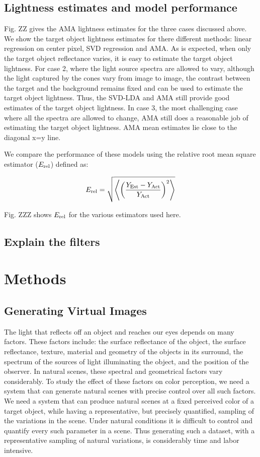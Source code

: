 \documentclass{jov}
\begin{document}
\subsection{Lightness estimates and model performance}
Fig. ZZ gives the AMA lightness estimates for the three cases discussed above. We show the target object lightness estimates for there different methods: linear regression on center pixel, SVD regression and AMA. As is expected, when only the target object reflectance varies, it is easy to estimate the target object lightness. For case 2, where the light source spectra are allowed to vary, although the light captured by the cones vary from image to image, the contrast between the target and the background remains fixed and can be used to estimate the target object lightness. Thus, the SVD-LDA and AMA still provide good estimates of the target object lightness. In case 3, the most challenging case where all the spectra are allowed to change, AMA still does a reasonable job of estimating the target object lightness. AMA mean estimates lie close to the diagonal x=y line.

We compare the performance of these models using the relative root mean square estimator ($E_{\rm rel}$) defined as:

\begin{align}
E_{\rm rel} = \sqrt{\left\langle\left(\frac{Y_{\rm Est}-Y_{\rm Act}}{Y_{\rm Act}}\right)^2\right\rangle}
\end{align}

Fig. ZZZ shows $E_{\rm rel}$ for the various estimators used here.

\subsection{Explain the filters}

\section{Methods}
\subsection{Generating Virtual Images}
The light that reflects off an object and reaches our eyes depends on many factors. These factors include: the surface reflectance of the object, the surface reflectance, texture, material and geometry of the objects in its surround, the spectrum of the sources of light illuminating the object, and the position of the observer. In natural scenes, these spectral and geometrical factors vary considerably. To study the effect of these factors on color perception, we need a system that can generate natural scenes with precise control over all such factors. We need a system that can produce natural scenes at a fixed perceived color of a target object, while having a representative, but precisely quantified, sampling of the variations in the scene. Under natural conditions it is difficult to control and quantify every such parameter in a scene. Thus generating such a dataset, with a representative sampling of natural variations, is considerably time and labor intensive.
\end{document}
